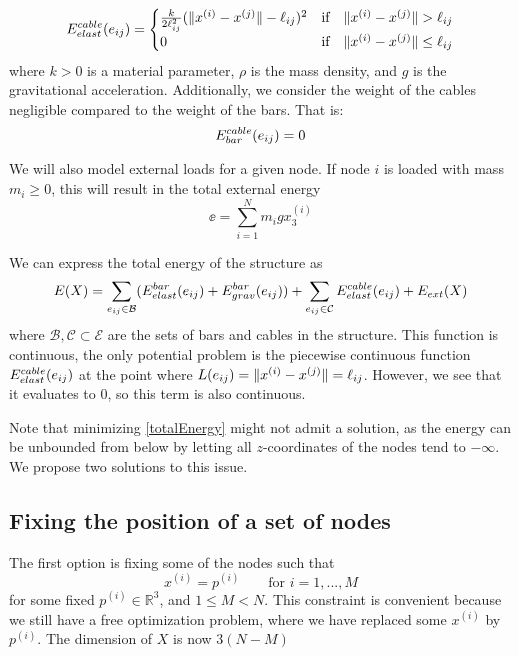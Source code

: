 \begin{equation}
E^{cable}_{elast}(e_{ij}) = \begin{cases}
    \frac{k}{2\ell_{ij}^2}(\lVert x^{(i)} - x^{(j)}\rVert-\ell_{ij})^2 & \text{if} \quad \lVert x^{(i)} - x^{(j)}\rVert >\ell_{ij}\\
    0 & \text{if} \quad \lVert x^{(i)} - x^{(j)}\rVert \leq \ell_{ij}
    \end{cases}
    \label{cableElast}
\end{equation}
where $k > 0$ is a material parameter, $\rho$ is the mass density, and $g$ is the gravitational acceleration. Additionally, we consider the weight of the cables negligible compared to the weight of the bars. That is:
\begin{equation}
    E^{cable}_{bar}(e_{ij}) = 0
    \label{cableGrav}
\end{equation}

We will also model external loads for a given node. If node $i$ is loaded with mass $m_i \geq 0$, this will result in the total external energy
\begin{equation}
    \ee = \sum_{i=1}^{N} m_i g x_3^{(i)}
    \label{externalEnergy}
\end{equation}

We can express the total energy of the structure as \begin{equation}
    E(X) = \sum\limits_{e_{ij} \in \mathcal{B}}(E^{bar}_{elast}(e_{ij}) + E^{bar}_{grav}(e_{ij})) + \sum\limits_{e_{ij} \in \mathcal{C}} E^{cable}_{elast}(e_{ij}) + E_{ext}(X)
    \label{totalEnergy}
\end{equation} where $\mathcal{B}, \mathcal{C} \subset \mathcal{E}$ are the sets of bars and cables in the structure. This function is continuous, the only potential problem is the piecewise continuous function $E^{cable}_{elast}(e_{ij})$ at the point where $L(e_{ij}) = \lVert x^{(i)} - x^{(j)}\rVert = \ell_{ij}$. However, we see that it evaluates to $0$, so this term is also continuous.

Note that minimizing \eqref{totalEnergy} might not admit a solution, as the energy can be unbounded from below by letting all $z$-coordinates of the nodes tend to $-\infty$. We propose two solutions to this issue.

\subsection{Fixing the position of a set of nodes}
The first option is fixing some of the nodes such that
\begin{equation}
    x^{(i)} = p^{(i)} \qquad \text{for } i = 1,...,M
    \label{fixednode}
\end{equation} for some fixed $p^{(i)} \in \mathbb{R}^3$, and $1\leq M < N$. This constraint is convenient because we still have a free optimization problem, where we have replaced some $x^{(i)}$ by $p^{(i)}$. The dimension of $X$ is now $3(N-M)$

